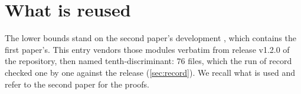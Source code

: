 \documentclass[11pt]{article}
\theoremstyle{definition}
\begin{document}
\section{What is reused}\label{sec:reused}

The lower bounds stand on the second paper's development \cite{HCNpaper}, which contains the first paper's. This entry vendors those modules verbatim from release v1.2.0 of the repository, then named tenth-discriminant: $76$ files, which the run of record checked one by one against the release (\cref{sec:record}). We recall what is used and refer to the second paper for the proofs.
\end{document}
